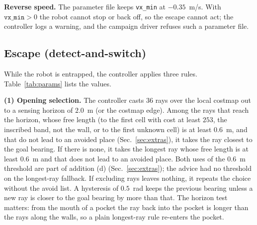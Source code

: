 \documentclass[journal]{IEEEtran}
\begin{document}
\textbf{Reverse speed.} The parameter file keeps \texttt{vx\_min} at
$-0.35$~m/s. With $\texttt{vx\_min}>0$ the robot cannot stop or back off, so
the escape cannot act; the controller logs a warning, and the campaign
driver refuses such a parameter file.

\subsection{Escape (detect-and-switch)}
\label{sec:escape}

While the robot is entrapped, the controller applies three rules. Table~\ref{tab:params} lists the values.

\textbf{(1) Opening selection.} The controller casts $36$ rays over the local costmap
out to a sensing horizon of $2.0$~m (or the costmap edge). Among the rays that reach
the horizon, whose free length (to the first cell with cost at least $253$, the inscribed
band, not the wall, or to the first unknown cell) is at least $0.6$~m, and that do not lead to an avoided
place (Sec.~\ref{sec:extras}), it takes the ray closest to the goal bearing. If there is
none, it takes the longest ray whose free length is at least $0.6$~m and that does not lead
to an avoided place. Both uses of the $0.6$~m threshold are part of addition (d)
(Sec.~\ref{sec:extras}); the advice had no threshold on the longest-ray fallback. If excluding rays leaves nothing, it repeats the choice without the avoid list.
A hysteresis of $0.5$~rad keeps the previous bearing unless a new ray is closer to the
goal bearing by more than that. The horizon test matters: from the mouth of a pocket the
ray back into the pocket is longer than the rays along the walls, so a plain
longest-ray rule re-enters the pocket.
\end{document}
